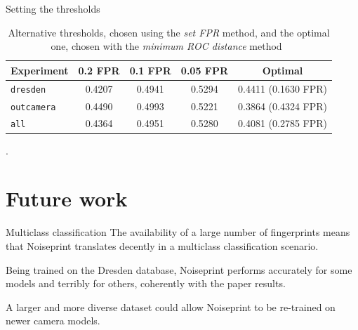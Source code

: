 \begin{frame}{Setting the thresholds}

    \begin{table}[]
        \centering
        \begin{tabular}{|l|c|c|c|c|}
            \hline
            \textbf{Experiment} & \textbf{0.2 FPR} & \textbf{0.1 FPR} & \textbf{0.05 FPR} & \textbf{Optimal} \\
            \hline
            \texttt{dresden} & 0.4207 & 0.4941 & 0.5294 & 0.4411 {\footnotesize (0.1630 FPR)}\\
            \texttt{outcamera} & 0.4490 & 0.4993 & 0.5221 & 0.3864 {\footnotesize (0.4324 FPR)} \\
            \texttt{all} & 0.4364 & 0.4951 & 0.5280 & 0.4081 {\footnotesize (0.2785 FPR)} \\
            \hline
        \end{tabular}
        \captionsetup{justification=centering}
        \caption{Alternative thresholds, chosen using the \textit{set FPR} method, and the optimal one, chosen with the \textit{minimum ROC distance} method~\cite{roc-curve}}.
    \end{table}
    
\end{frame}

\section{Future work}

\begin{frame}{Multiclass classification}
    The availability of a large number of fingerprints means that Noiseprint translates decently in a multiclass classification scenario.
    
    \medskip
    
    Being trained on the Dresden database, Noiseprint performs accurately for some models and terribly for others, coherently with the paper results.
    
    \medskip
    
    A larger and more diverse dataset could allow Noiseprint to be re-trained on newer camera models.
\end{frame}


